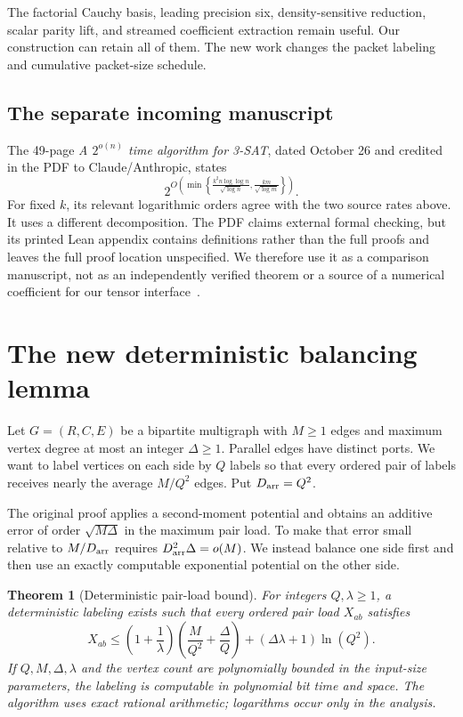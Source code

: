 \documentclass[11pt,letterpaper]{article}
\numberwithin{equation}{section}
\newtheorem{theorem}{Theorem}[section]
\theoremstyle{definition}\newtheorem{definition}[theorem]{Definition}
\theoremstyle{remark}\newtheorem{remark}[theorem]{Remark}
\begin{document}
The factorial Cauchy basis, leading precision six, density-sensitive reduction, scalar parity lift, and streamed coefficient extraction remain useful. Our construction can retain all of them. The new work changes the packet labeling and cumulative packet-size schedule.

\subsection{The separate incoming manuscript}

The 49-page \emph{A $2^{o(n)}$ time algorithm for 3-SAT}, dated October 26 and credited in the PDF to Claude/Anthropic, states
\[
 2^{O\!\left(\min\left\{
 \frac{k^2n\log\log n}{\sqrt{\log n}},
 \frac{km}{\sqrt{\log m}}\right\}\right)}.
\]
For fixed $k$, its relevant logarithmic orders agree with the two source rates above. It uses a different decomposition. The PDF claims external formal checking, but its printed Lean appendix contains definitions rather than the full proofs and leaves the full proof location unspecified. We therefore use it as a comparison manuscript, not as an independently verified theorem or a source of a numerical coefficient for our tensor interface~\cite{separatemanuscript}.

\section{The new deterministic balancing lemma}
\label{sec:balancing}

Let $G=(R,C,E)$ be a bipartite multigraph with $M\ge1$ edges and maximum vertex degree at most an integer $\Delta\ge1$. Parallel edges have distinct ports. We want to label vertices on each side by $Q$ labels so that every ordered pair of labels receives nearly the average $M/Q^2$ edges. Put $D_{\rm arr}=Q^2$.

The original proof applies a second-moment potential and obtains an additive error of order $\sqrt{M\Delta}$ in the maximum pair load. To make that error small relative to $M/D_{\rm arr}$ requires $D_{\rm arr}^2\Delta=o(M)$. We instead balance one side first and then use an exactly computable exponential potential on the other side.

\begin{theorem}[Deterministic pair-load bound]\label{thm:balance}
For integers $Q,\lambda\ge1$, a deterministic labeling exists such that every ordered pair load $X_{ab}$ satisfies
\begin{equation}\label{eq:load}
 X_{ab}\le
 \left(1+\frac1\lambda\right)
      \left(\frac{M}{Q^2}+\frac{\Delta}{Q}\right)
 +(\Delta\lambda+1)\ln(Q^2).
\end{equation}
If $Q,M,\Delta,\lambda$ and the vertex count are polynomially bounded in the input-size parameters, the labeling is computable in polynomial bit time and space. The algorithm uses exact rational arithmetic; logarithms occur only in the analysis.
\end{theorem}
\end{document}
